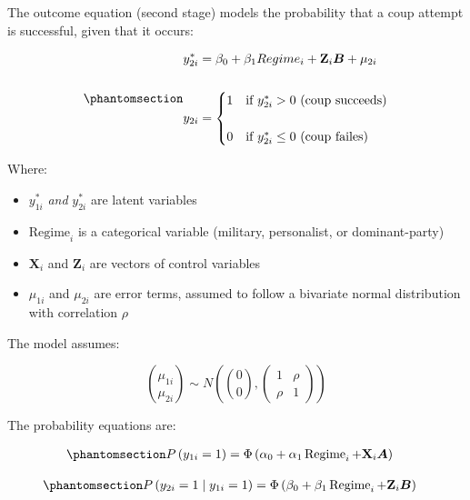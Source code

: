 \documentclass[
  12pt,
]{report}
\begin{document}
The outcome equation (second stage) models the probability that a coup
attempt is successful, given that it occurs:

\begin{equation}\phantomsection\label{eq-eq5}{
\begin{aligned}
y_{2i}^*&=\beta_0 + \beta_1 Regime_i + \mathbf{Z}_i \boldsymbol{B} + \mu_{2i}
\\
\\
y_{2i} &= 
\begin{cases} 
1 &\text{if $y_{2i}^*>0$ (coup succeeds)} \\
\\
0 &\text{if $y_{2i}^*\le0$ (coup failes)}
\end{cases}
\end{aligned}
}\end{equation}

Where:

\begin{itemize}
\item
  \(y_{1i}^*\) \emph{and} \(y_{2i}^*\) are latent variables
\item
  \(\text{Regime}_i\) is a categorical variable (military, personalist,
  or dominant-party)
\item
  \(\mathbf{X}_i\) and \(\mathbf{Z}_i\) are vectors of control variables
\item
  \(\mu_{1i}\) and \(\mu_{2i}\) are error terms, assumed to follow a
  bivariate normal distribution with correlation \(\rho\)
\end{itemize}

The model assumes:

\[
\binom{\mu_{1 i}}{\mu_{2 i}} \sim N\left(\binom{0}{0},\left(\begin{array}{ll}
1 & \rho \\
\rho & 1
\end{array}\right)\right)
\]

The probability equations are:

\begin{equation}\phantomsection\label{eq-eq7}{
\begin{aligned}
P\left(y_{1 i}=1\right) & =\Phi\left(\alpha_0+\alpha_1 \operatorname{Regime}_i+\mathbf{X}_i \boldsymbol{A}\right)
\end{aligned}
}\end{equation}

\begin{equation}\phantomsection\label{eq-eq8}{
\begin{aligned}
P\left(y_{2 i}=1 \mid y_{1 i}=1\right) & =\Phi\left(\beta_0+\beta_1 \operatorname{Regime}_i+\mathbf{Z}_i \boldsymbol{B}\right)
\end{aligned}
}\end{equation}
\end{document}
